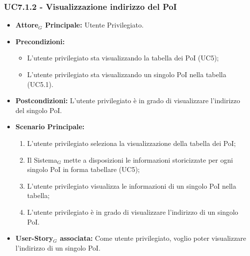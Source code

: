 \documentclass[10pt]{article}
\begin{document}
\begin{justify}
\subsubsection{\textbf{UC7.1.2 - Visualizzazione indirizzo del PoI}}
\label{UC7.1.2}
\begin{itemize}
    \item \textbf{Attore$_G$ Principale:} Utente Privilegiato.
    \item \textbf{Precondizioni:} 
        \begin{itemize}
          \item L'utente privilegiato sta visualizzando la tabella dei PoI (UC5);
            \item L'utente privilegiato sta visualizzando un singolo PoI nella tabella (UC5.1).
        \end{itemize}
      \item \textbf{Postcondizioni:} L'utente privilegiato è in grado di visualizzare l'indirizzo del singolo PoI.
    \item \textbf{Scenario Principale:} 
        \begin{enumerate}
        \item L'utente privilegiato seleziona la visualizzazione della tabella dei PoI;
          \item Il Sistema$_G$ mette a disposizioni le informazioni storicizzate per ogni singolo PoI in forma tabellare (UC5);
          \item L'utente privilegiato visualizza le informazioni di un singolo PoI nella tabella;
            \item L'utente privilegiato è in grado di visualizzare l'indirizzo di un singolo PoI.
        \end{enumerate}
    \item \textbf{User-Story$_G$ associata:} Come utente privilegiato, voglio poter visualizzare l'indirizzo di un singolo PoI.
\end{itemize}

\end{justify}
\end{document}
